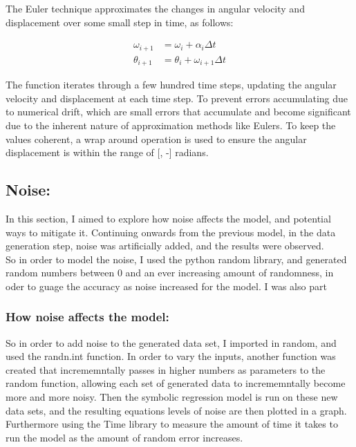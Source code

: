 \documentclass{article}
\begin{document}
The Euler technique approximates the changes in angular velocity and displacement over some small step in time, as follows:\\

\begin{center}
\begin{align} 
\omega_{i+1} &= \omega_i + \alpha_i \Delta t \\
\theta_{i+1} &= \theta_i + \omega_{i+1} \Delta t 
\end{align}
\end{center}


The function iterates through a few hundred time steps, updating the angular velocity and displacement at each time step. To prevent errors accumulating due to numerical drift, which are small errors that accumulate and become significant due to the inherent nature of approximation methods like Eulers. To keep the values coherent, a wrap around operation is used to ensure the angular displacement is within the range of [\pi, -\pi] radians.\\ 

\subsection{Noise: }

In this section, I aimed to explore how noise affects the model, and potential ways to mitigate it. Continuing
onwards from the previous model, in the data generation step, noise was artificially added, and the results were
observed.\\

So in order to model the noise, I used the python random library, and generated random numbers between 0 and
an ever increasing amount of randomness, in oder to guage the accuracy as noise increased for the model. I was
also part\\

\subsubsection{How noise affects the model: }
So in order to add noise to the generated data set, I imported in random, and used the randn.int function. In order
to vary the inputs, another function was created that incrememntally passes in higher numbers as parameters
to the random function, allowing each set of generated data to incrememntally become more and more noisy.
Then the symbolic regression model is run on these new data sets, and the resulting equations levels of noise
are then plotted in a graph. Furthermore using the Time library to measure the amount of time it takes to run
the model as the amount of random error increases.
\end{document}
